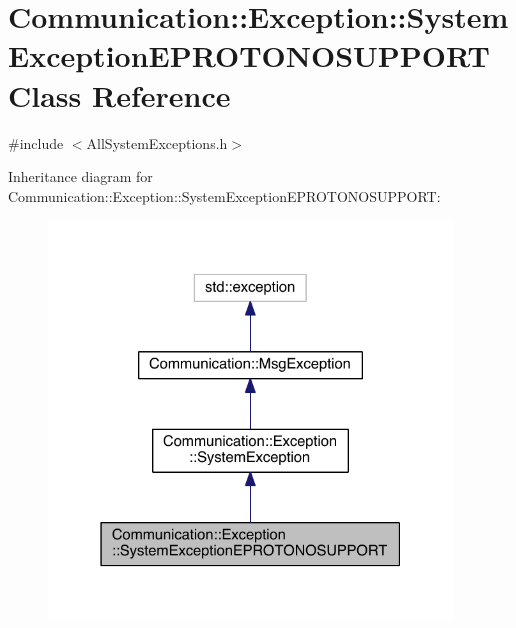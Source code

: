 \hypertarget{class_communication_1_1_exception_1_1_system_exception_e_p_r_o_t_o_n_o_s_u_p_p_o_r_t}{}\section{Communication\+:\+:Exception\+:\+:System\+Exception\+E\+P\+R\+O\+T\+O\+N\+O\+S\+U\+P\+P\+O\+R\+T Class Reference}
\label{class_communication_1_1_exception_1_1_system_exception_e_p_r_o_t_o_n_o_s_u_p_p_o_r_t}


{\ttfamily \#include $<$All\+System\+Exceptions.\+h$>$}



Inheritance diagram for Communication\+:\+:Exception\+:\+:System\+Exception\+E\+P\+R\+O\+T\+O\+N\+O\+S\+U\+P\+P\+O\+R\+T\+:\nopagebreak
\begin{figure}[H]
\begin{center}
\leavevmode
\includegraphics[width=304pt]{class_communication_1_1_exception_1_1_system_exception_e_p_r_o_t_o_n_o_s_u_p_p_o_r_t__inherit__graph}
\end{center}
\end{figure}


